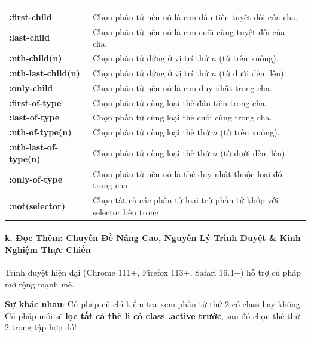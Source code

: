\begin{prettyTableBox}
\sffamily\small
\begin{tabularx}{\linewidth}{|>{\ttfamily\color{accentOrange}\bfseries}m{4.2cm}|Z|}
\hline
{}  &  \\
\hline
:first-child & Chọn phần tử nếu nó là con đầu tiên tuyệt đối của cha. \\
\hline
:last-child & Chọn phần tử nếu nó là con cuối cùng tuyệt đối của cha. \\
\hline
:nth-child(n) & Chọn phần tử đứng ở vị trí thứ $n$ (từ trên xuống). \\
\hline
:nth-last-child(n) & Chọn phần tử đứng ở vị trí thứ $n$ (từ dưới đếm lên). \\
\hline
:only-child & Chọn phần tử nếu nó là con duy nhất trong cha. \\
\hline
:first-of-type & Chọn phần tử cùng loại thẻ đầu tiên trong cha. \\
\hline
:last-of-type & Chọn phần tử cùng loại thẻ cuối cùng trong cha. \\
\hline
:nth-of-type(n) & Chọn phần tử cùng loại thẻ thứ $n$ (từ trên xuống). \\
\hline
:nth-last-of-type(n) & Chọn phần tử cùng loại thẻ thứ $n$ (từ dưới đếm lên). \\
\hline
:only-of-type & Chọn phần tử nếu nó là thẻ duy nhất thuộc loại đó trong cha. \\
\hline
:not(selector) & Chọn tất cả các phần tử loại trừ phần tử khớp với selector bên trong. \\
\hline
\end{tabularx}
\end{prettyTableBox}

\paragraph{k. Đọc Thêm: Chuyên Đề Nâng Cao, Nguyên Lý Trình Duyệt \& Kinh Nghiệm Thực Chiến}

\begin{conceptBox}
Trình duyệt hiện đại (Chrome 111+, Firefox 113+, Safari 16.4+) hỗ trợ cú pháp mở rộng mạnh mẽ.
\par\vspace{4pt}
\textbf{Sự khác nhau}: Cú pháp cũ  chỉ kiểm tra xem phần tử thứ 2 có class  hay không. Cú pháp mới  sẽ \textbf{lọc tất cả thẻ li có class .active trước}, sau đó chọn thẻ thứ 2 trong tập hợp đó!
\end{conceptBox}

